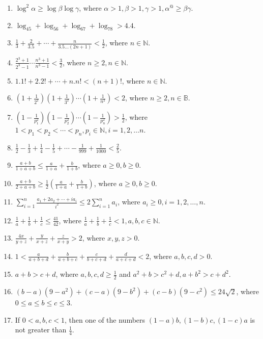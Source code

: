 \begin{enumerate}
\item $\log^2\alpha\geq \log\beta\log\gamma$, where $\alpha>1, \beta>1, \gamma>1, \alpha^@\geq\beta\gamma$.
\item $\log_45 + \log_56 + \log_67 + \log_78> 4.4$.
\item $\frac{1}{3} + \frac{2}{3.5} + \cdots + \frac{n}{3.5\ldots(2n + 1)} < \frac{1}{2}$, where $n\in\mathbb{N}$.
\item $\frac{2^3 + 1}{2^3 - 1}\cdots\frac{n^3 + 1}{n^3 - 1}< \frac{3}{2}$, where $n\geq 2, n\in\mathbb{N}$.
\item $1.1! + 2.2! + \cdots + n.n! < (n + 1)!$, where $n\in\mathbb{N}$.
\item $\left(1 + \frac{1}{2^2}\right)\left(1 + \frac{1}{3^2}\right)\cdots\left(1 + \frac{1}{n^2}\right) < 2$, where $n\geq 2,
  n\in\mathbb{B}$.
\item $\left(1 - \frac{1}{p_1^2}\right)\left(1 - \frac{1}{p_2^2}\right)\cdots\left(1 - \frac{1}{p_n^2}\right) > \frac{1}{2}$, where
  $1 < p_1 < p_2 <\cdots < p_n, p_i\in\mathbb{N}, i = 1, 2, \ldots n$.
\item $\frac{1}{2} - \frac{1}{3} + \frac{1}{4} - \frac{1}{5} + \cdots - \frac{1}{999} + \frac{1}{1000}<\frac{2}{5}$.
\item $\frac{a + b}{1 + a + b}\leq \frac{a}{1 + a} + \frac{b}{1 + b}$, where $a\geq 0, b\geq 0$.
\item $\frac{a + b}{2 + a + b}\geq \frac{1}{2}\left(\frac{a}{1 + a} + \frac{b}{1 + b}\right)$, where $a\geq 0, b\geq 0$.
\item $\displaystyle\sum_{i=1}^n\frac{a_1 + 2a_2 + \cdots + ia_i}{i^2}\leq 2\sum_{i=1}^na_i$, where $a_i\geq 0, i=1, 2, \ldots, n$.
\item $\frac{1}{a} + \frac{1}{b} + \frac{1}{c}\leq \frac{41}{42}$, where $\frac{1}{a} + \frac{1}{b} + \frac{1}{c}< 1, a, b,
  c\in\mathbb{N}$.
\item $\frac{4x}{y + z} + \frac{y}{x + z} + \frac{z}{x + y} > 2$, where $x,y,z > 0$.
\item $1 < \frac{a}{a + b + d} + \frac{b}{a + b + c} + \frac{c}{b + c + d} + \frac{d}{a + c + d}< 2$, where $a,b,c,d > 0$.
\item $a + b > c + d$, where $a, b, c, d\geq \frac{1}{2}$ and $a^2 + b > c^2 + d, a + b^2 > c + d^2$.
\item $(b - a)(9 - a^2) + (c - a)(9 - b^2) + (c - b)(9 - c^2)\leq 24\sqrt{2}$, where $0\leq a\leq b\leq c\leq 3$.
\item If $0<a, b, c < 1$, then one of the numbers $(1 - a)b, (1 - b)c, (1 - c)a$ is not greater than $\frac{1}{4}$.

\end{enumerate}

